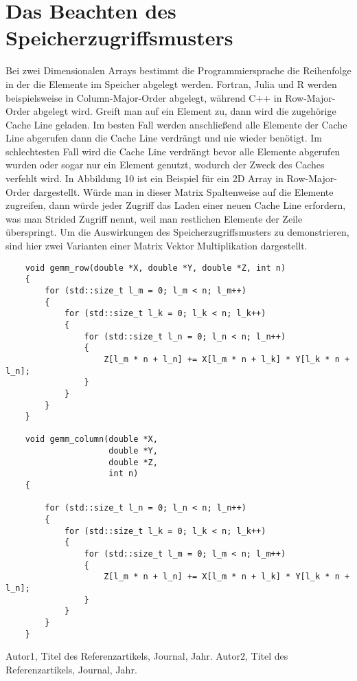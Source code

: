 \documentclass{article}
\begin{document}
\section{Das Beachten des Speicherzugriffsmusters}
    Bei zwei Dimensionalen Arrays bestimmt die Programmiersprache die Reihenfolge 
    in der die Elemente im Speicher abgelegt werden. Fortran, Julia und R werden beispielsweise
    in Column-Major-Order abgelegt, während C++ in Row-Major-Order abgelegt wird.
    Greift man auf ein Element zu, dann wird die zugehörige Cache Line geladen.
    Im besten Fall werden anschließend alle Elemente der Cache Line abgerufen dann die Cache Line verdrängt 
    und nie wieder benötigt. Im schlechtesten Fall wird die Cache Line verdrängt bevor alle Elemente abgerufen wurden 
    oder sogar nur ein Element genutzt, wodurch der Zweck des Caches verfehlt wird.
    In Abbildung 10 ist ein Beispiel für ein 2D Array in Row-Major-Order dargestellt. %
    Würde man in dieser Matrix Spaltenweise auf die Elemente zugreifen,
    dann würde jeder Zugriff das Laden einer neuen Cache Line erfordern, was man Strided Zugriff nennt, 
    weil man restlichen Elemente der Zeile überspringt.
    Um die Auswirkungen des Speicherzugriffsmusters zu demonstrieren, sind hier zwei 
    Varianten einer Matrix Vektor Multiplikation dargestellt.

    \begin{verbatim}
    void gemm_row(double *X, double *Y, double *Z, int n)
    {
        for (std::size_t l_m = 0; l_m < n; l_m++)
        {
            for (std::size_t l_k = 0; l_k < n; l_k++)
            {
                for (std::size_t l_n = 0; l_n < n; l_n++)
                {
                    Z[l_m * n + l_n] += X[l_m * n + l_k] * Y[l_k * n + l_n];
                }
            }
        }
    }
    
    void gemm_column(double *X,
                     double *Y,
                     double *Z,
                     int n)
    {
    
        for (std::size_t l_n = 0; l_n < n; l_n++)
        {
            for (std::size_t l_k = 0; l_k < n; l_k++)
            {
                for (std::size_t l_m = 0; l_m < n; l_m++)
                {
                    Z[l_m * n + l_n] += X[l_m * n + l_k] * Y[l_k * n + l_n];
                }
            }
        }
    }
    \end{verbatim}











\begin{thebibliography}{9}
 Autor1, Titel des Referenzartikels, Journal, Jahr.
 Autor2, Titel des Referenzartikels, Journal, Jahr.
\end{thebibliography}
\end{document}
